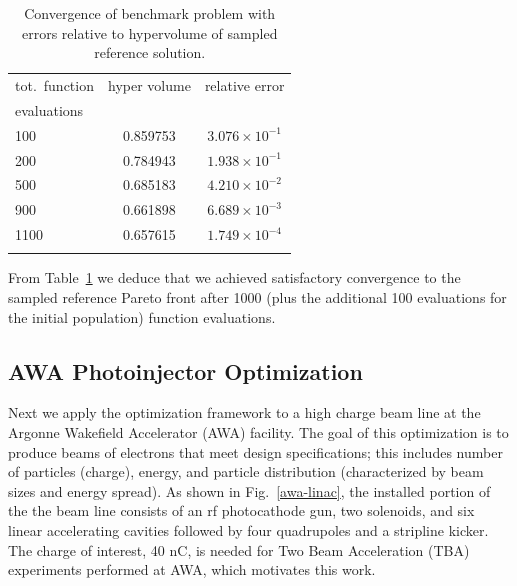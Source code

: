 \begin{table}%
\begin{center}
  \caption{Convergence of benchmark problem with errors relative to
    hypervolume of sampled reference solution.}
  \label{tbl:bench_rms_error}
  \begin{tabular}{lcc}
    \hline\noalign{\smallskip}
    tot.\ function  & hyper volume & relative error\\
    evaluations    & & \\
    \noalign{\smallskip}\hline\noalign{\smallskip}
    100  &  0.859753 & $3.076 \times 10^{-1}$ \\
    \noalign{\smallskip}\hline\noalign{\smallskip}
    200  &  0.784943 & $1.938 \times 10^{-1}$ \\
    500  &  0.685183 & $4.210 \times 10^{-2}$ \\
    900  &  0.661898 & $6.689 \times 10^{-3}$ \\
    1100 &  0.657615 & $1.749 \times 10^{-4}$ \\
    \noalign{\smallskip}\hline
  \end{tabular}
\end{center}
\end{table}

From Table~\ref{tbl:bench_rms_error} we deduce that we achieved satisfactory
  convergence to the sampled reference Pareto front after 1000 (plus the
  additional 100 evaluations for the initial population) function evaluations.



\subsection{AWA Photoinjector Optimization} \label{awaproblem}
Next we apply the optimization framework to a high charge beam line
 at the Argonne Wakefield Accelerator (AWA) facility. 
The goal of this optimization is to produce beams of electrons that meet 
design specifications; this includes number of particles (charge), energy, and particle distribution (characterized by beam sizes and energy spread).
As shown in Fig.~\ref{awa-linac}, the installed portion of the the 
beam line consists of an rf photocathode gun, 
two solenoids, and six linear accelerating cavities
followed by four quadrupoles and a stripline kicker. 
The charge of interest, 40 nC, is needed for Two Beam 
Acceleration (TBA) \cite{gai_power_jing_2012,JING201872} 
experiments performed at AWA, which motivates this work. 

